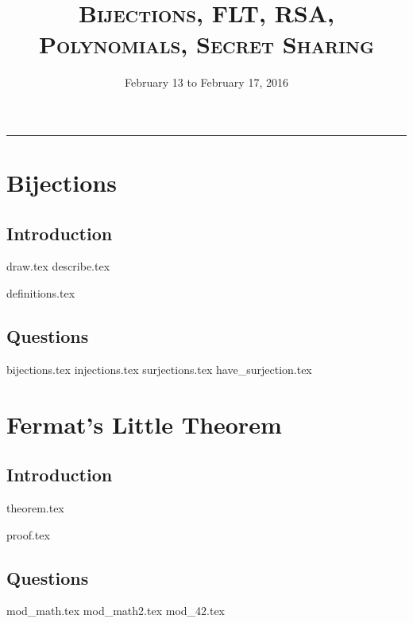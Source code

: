 \documentclass{exam}
\title{\textsc{Bijections, FLT, RSA, Polynomials, Secret Sharing}}
\date{February 13 to February 17, 2016}
\begin{document}
\maketitle
\rule{\textwidth}{0.15em}
\fontsize{12}{15}\selectfont
\thispagestyle{empty}

\section{Bijections}
\subsection{Introduction}
\begin{questions}
{draw.tex}
{describe.tex}
\end{questions}
{definitions.tex}
\subsection{Questions}
\begin{questions}
{bijections.tex}
{injections.tex}
{surjections.tex}
{have_surjection.tex}
\end{questions}

\section{Fermat's Little Theorem}
\subsection{Introduction}
{theorem.tex}
\begin{questions}
{proof.tex}
\end{questions}
\subsection{Questions}
\begin{questions}
{mod_math.tex}
{mod_math2.tex}
{mod_42.tex}
\end{questions}
\end{document}
